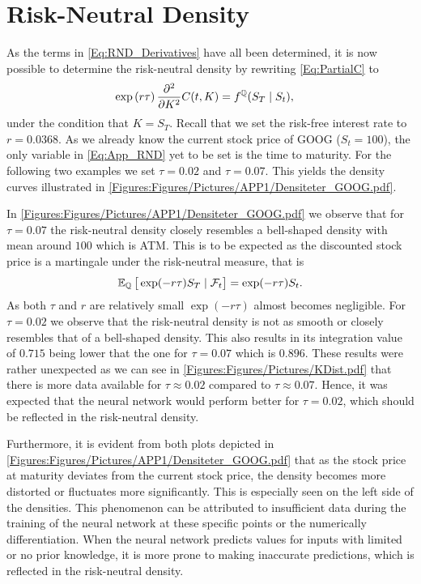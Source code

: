 \section{Risk-Neutral Density}\label{Sec.App:RND}
As the terms in \eqref{Eq:RND_Derivatives} have all been determined, it is now possible to determine the risk-neutral density by rewriting \eqref{Eq:PartialC} to
\begin{align}\label{Eq:App_RND}
    \exp\left(r\tau\right)\frac{\partial^2}{\partial K^2}C(t,K) &= f^{\mathbb{Q}}(S_T\mid S_t),
\end{align}
under the condition that $K=S_T$. Recall that we set the risk-free interest rate to $r=0.0368$. As we already know the current stock price of GOOG ($S_t=100$), the only variable in \eqref{Eq:App_RND} yet to be set is the time to maturity. For the following two examples we set $\tau=0.02$ and $\tau=0.07$. This yields the density curves illustrated in \autoref{Figures:Figures/Pictures/APP1/Densiteter_GOOG.pdf}.


In \autoref{Figures:Figures/Pictures/APP1/Densiteter_GOOG.pdf} we observe that for $\tau=0.07$ the risk-neutral density closely resembles a bell-shaped density with mean around $100$ which is ATM. This is to be expected as the discounted stock price is a martingale under the risk-neutral measure, that is
\begin{align*}
    \E[\Q]{\exp(-r\tau)S_T\mid\mathcal{F}_t} = \exp(-r\tau)S_t.
\end{align*}
As both $\tau$ and $r$ are relatively small $\exp(-r\tau)$ almost becomes negligible. For $\tau=0.02$ we observe that the risk-neutral density is not as smooth or closely resembles that of a bell-shaped density. This also results in its integration value of $0.715$ being lower that the one for $\tau=0.07$ which is $0.896$. These results were rather unexpected as we can see in \autoref{Figures:Figures/Pictures/KDist.pdf} that there is more data available for $\tau\approx0.02$ compared to $\tau\approx0.07$. Hence, it was expected that the neural network would perform better for $\tau = 0.02$, which should be reflected in the risk-neutral density.

Furthermore, it is evident from both plots depicted in \autoref{Figures:Figures/Pictures/APP1/Densiteter_GOOG.pdf} that as the stock price at maturity deviates from the current stock price, the density becomes more distorted or fluctuates more significantly. This is especially seen on the left side of the densities. This phenomenon can be attributed to insufficient data during the training of the neural network at these specific points or the numerically differentiation. When the neural network predicts values for inputs with limited or no prior knowledge, it is more prone to making inaccurate predictions, which is reflected in the risk-neutral density.


